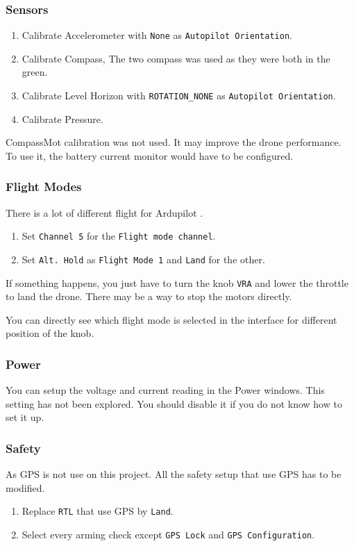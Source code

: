 \subsubsection{Sensors}
\begin{enumerate}
    \item Calibrate Accelerometer with \texttt{None} as \texttt{Autopilot Orientation}.
    \item Calibrate Compass, The two compass was used as they were both in the green.
    \item Calibrate Level Horizon  with \texttt{ROTATION\_NONE} as \texttt{Autopilot Orientation}.
    \item Calibrate Pressure.
\end{enumerate}
CompassMot calibration was not used. It may improve the drone performance. To use it, the battery current monitor would have to be configured.

\subsubsection{Flight Modes}
There is a lot of different flight for Ardupilot \cite{ardupilot_flight_modes}.
\begin{enumerate}
    \item Set \texttt{Channel 5} for the \texttt{Flight mode channel}.
    \item Set \texttt{Alt. Hold} as \texttt{Flight Mode 1} and \texttt{Land} for the other.
\end{enumerate}
If something happens, you just have to turn the knob \texttt{VRA} and lower the throttle to land the drone.
There may be a way to stop the motors directly.

You can directly see which flight mode is selected in the interface for different position of the knob.

\subsubsection{Power}
You can setup the voltage and current reading in the Power windows.
This setting has not been explored. You should disable it if you do not know how to set it up.

\subsubsection{Safety}
As GPS is not use on this project. All the safety setup that use GPS has to be modified.
\begin{enumerate}
    \item Replace \texttt{RTL} that use GPS by \texttt{Land}.
    \item Select every arming check except \texttt{GPS Lock} and \texttt{GPS Configuration}.
\end{enumerate}


